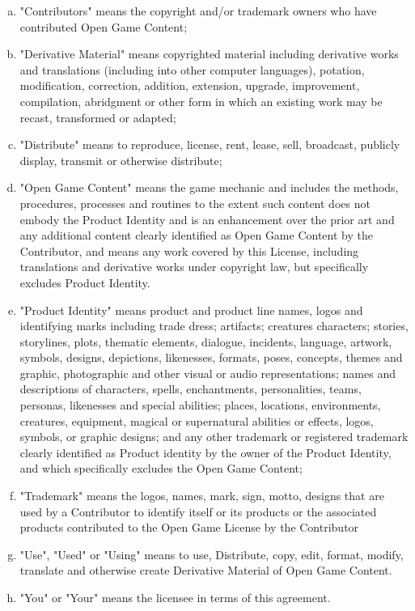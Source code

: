 \begin{enumerate}[(a)]
\item "Contributors" means the copyright and/or trademark owners who have contributed Open Game Content;
\item "Derivative Material" means copyrighted material including derivative works and translations (including into other computer languages), potation, modification, correction, addition, extension, upgrade, improvement, compilation, abridgment or other form in which an existing work may be recast, transformed or adapted;
\item "Distribute" means to reproduce, license, rent, lease, sell, broadcast, publicly display, transmit 
or otherwise distribute;
\item "Open Game Content" means the game mechanic and includes the methods, procedures, processes and routines to the extent such content does not embody the Product Identity and is an enhancement over the prior art and any additional content clearly identified as Open Game Content by the Contributor, and means any work covered by this License, including translations and derivative works under copyright law, but specifically excludes Product Identity.
\item "Product Identity" means product and product line names, logos and identifying marks including trade dress; artifacts; creatures characters; stories, storylines, plots, thematic elements, dialogue, incidents, language, artwork, symbols, designs, depictions, likenesses, formats, poses, concepts, themes and graphic, photographic and other visual or audio representations; names and descriptions of characters, spells, enchantments, personalities, teams, personas, likenesses and special abilities; places, locations, environments, creatures, equipment, magical or supernatural abilities or effects, logos, symbols, or graphic designs; and any other trademark or registered trademark clearly identified as Product identity by the owner of the Product Identity, and which specifically excludes the Open Game Content;
\item "Trademark" means the logos, names, mark, sign, motto, designs that are used by a Contributor to identify itself or its products or the associated products contributed to the Open Game License by the Contributor
\item "Use", "Used" or "Using" means to use, Distribute, copy, edit, format, modify, translate and otherwise create Derivative Material of Open Game Content.
\item "You" or "Your" means the licensee in terms of this agreement.
\end{enumerate}


